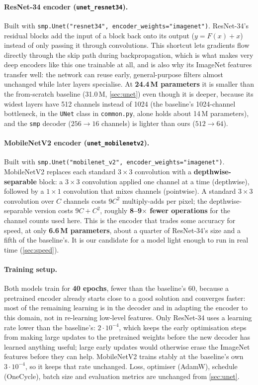\paragraph{ResNet-34 encoder (\texttt{unet\_resnet34}).}
Built with \texttt{smp.Unet("resnet34", encoder\_weights="imagenet")}. ResNet-34's residual blocks add the input
of a block back onto its output ($y = F(x) + x$) instead of only passing it through convolutions. This
shortcut lets gradients flow directly through the skip path during backpropagation, which is what makes
very deep encoders like this one trainable at all, and is also why its ImageNet features transfer well: the
network can reuse early, general-purpose filters almost unchanged while later layers specialise. At
\textbf{24.4\,M parameters} it is smaller than the from-scratch baseline (31.0\,M, \cref{sec:unet}) even though it is
deeper, because its widest layers have 512 channels instead of 1024 (the baseline's 1024-channel bottleneck,
in the \texttt{UNet} class in \texttt{common.py}, alone holds about 14\,M parameters), and the \texttt{smp} decoder
($256 \rightarrow 16$ channels) is lighter than ours ($512 \rightarrow 64$).

\paragraph{MobileNetV2 encoder (\texttt{unet\_mobilenetv2}).}
Built with \texttt{smp.Unet("mobilenet\_v2", encoder\_weights="imagenet")}. MobileNetV2 replaces each standard $3\times3$
convolution with a \textbf{depthwise-separable} block: a $3\times3$ convolution applied one channel at a time
(depthwise), followed by a $1\times1$ convolution that mixes channels (pointwise). A standard $3\times3$ convolution over
$C$ channels costs $9C^2$ multiply-adds per pixel; the depthwise-separable version costs $9C + C^2$, roughly
\textbf{8--9$\times$ fewer operations} for the channel counts used here. This is the encoder that trades some accuracy for
speed, at only \textbf{6.6\,M parameters}, about a quarter of ResNet-34's size and a fifth of the baseline's. It
is our candidate for a model light enough to run in real time (\cref{sec:speed}).

\paragraph{Training setup.}
Both models train for \textbf{40 epochs}, fewer than the baseline's 60, because a pretrained encoder already
starts close to a good solution and converges faster: most of the remaining learning is in the decoder and
in adapting the encoder to this domain, not in re-learning low-level features. Only ResNet-34 uses a
learning rate lower than the baseline's: \textbf{$2\cdot10^{-4}$}, which keeps the early optimisation steps from making
large updates to the pretrained weights before the new decoder has learned anything useful; large early
updates would otherwise erase the ImageNet features before they can help. MobileNetV2 trains stably at the
baseline's own \textbf{$3\cdot10^{-4}$}, so it keeps that rate unchanged. Loss, optimiser (AdamW), schedule (OneCycle),
batch size and evaluation metrics are unchanged from \cref{sec:unet}.

